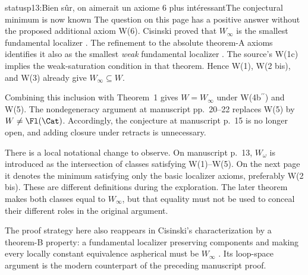 \begin{dcomment}{status}{p13:Bien sûr, on aimerait un axiome 6 plus intéressant}{The conjectural minimum is now known}
The question on this page has a positive answer without the proposed additional axiom W(6). Cisinski proved that \(W_\infty\) is the smallest fundamental localizer \citep[Theorem~2.2.11]{Cisinski2004Minimal}. The refinement to the absolute theorem-A axioms identifies it also as the smallest \emph{weak} fundamental localizer \citep[Theorem~6.1.18]{Cisinski2006}. The source's W(1c) implies the weak-saturation condition in that theorem. Hence W(1), W(2 bis), and W(3) already give \(W_\infty\subseteq W\).

Combining this inclusion with Theorem~1 gives \(W=W_\infty\) under W(4b\(^{\prime\prime}\)) and W(5). The nondegeneracy argument at manuscript pp.~20--22 replaces W(5) by \(W\ne\Fl(\Cat)\). Accordingly, the conjecture at manuscript p.~15 is no longer open, and adding closure under retracts is unnecessary.

There is a local notational change to observe. On manuscript p.~13, \(W_\omega\) is introduced as the intersection of classes satisfying W(1)--W(5). On the next page it denotes the minimum satisfying only the basic localizer axioms, preferably W(2 bis). These are different definitions during the exploration. The later theorem makes both classes equal to \(W_\infty\), but that equality must not be used to conceal their different roles in the original argument.

The proof strategy here also reappears in Cisinski's characterization by a theorem-B property: a fundamental localizer preserving components and making every locally constant equivalence aspherical must be \(W_\infty\) \citep[Theorem~2.3.6]{Cisinski2004Minimal}. Its loop-space argument is the modern counterpart of the preceding manuscript proof.
\end{dcomment}

